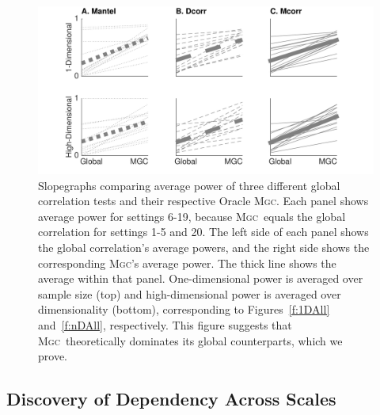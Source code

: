 \documentclass[11pt]{article}
\providecommand{\sct}[1]{{\normalfont\textsc{#1}}}
\newcommand{\Mgc}{\sct{Mgc}}
\newcommand{\Mgcp}{\sct{Mgc$_P$}}
\newcommand{\Hhg}{\sct{Hhg}}
\newcommand{\Dcorr}{\sct{Dcorr}}
\newcommand{\Mcorr}{\sct{Mcorr}}
\newcommand{\Mantel}{\sct{Mantel}}
\begin{document}
\begin{figure}
  \centering
  \includegraphics[width=1.0\textwidth]{Figures/FigSlope}
  \caption{
Slopegraphs comparing average power of three different global correlation tests and their respective Oracle \Mgc.  Each panel shows average power for settings 6-19, because \Mgc~equals the global correlation for settings 1-5 and  20. 
%
%
%
The left side of each panel shows the global correlation's average powers, and 
the right side shows the corresponding \Mgc's average power. The thick line shows the average within that panel. 
One-dimensional power is averaged over sample size (top)  and high-dimensional power is averaged over dimensionality (bottom), corresponding to Figures~\ref{f:1DAll} and~\ref{f:nDAll}, respectively.
This figure suggests that \Mgc~theoretically dominates its global counterparts, which we prove. 
}
\label{f:pp}
\end{figure}






\subsection*{Discovery of Dependency Across Scales}
\label{main3}
\end{document}
